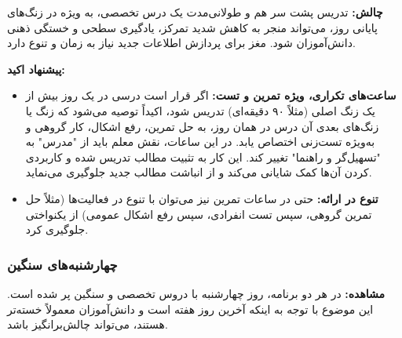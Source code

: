 \documentclass[a4paper]{article}
\begin{document}
\textbf{چالش:} تدریس پشت سر هم و طولانی‌مدت یک درس تخصصی، به ویژه در زنگ‌های پایانی روز، می‌تواند منجر به کاهش شدید تمرکز، یادگیری سطحی و خستگی ذهنی دانش‌آموزان شود. مغز برای پردازش اطلاعات جدید نیاز به زمان و تنوع دارد.

\textbf{پیشنهاد اکید:}
\begin{itemize}
    \item \textbf{ساعت‌های تکراری، ویژه تمرین و تست:}  اگر قرار است درسی در یک روز بیش از یک زنگ اصلی (مثلاً ۹۰ دقیقه‌ای) تدریس شود، اکیداً توصیه می‌شود که زنگ یا زنگ‌های بعدی آن درس در همان روز، به حل تمرین، رفع اشکال، کار گروهی و به‌ویژه تست‌زنی اختصاص یابد. در این ساعات، نقش معلم باید از "مدرس" به "تسهیل‌گر و راهنما" تغییر کند. این کار به تثبیت مطالب تدریس شده و کاربردی کردن آن‌ها کمک شایانی می‌کند و از انباشت مطالب جدید جلوگیری می‌نماید.
    \item \textbf{تنوع در ارائه:} حتی در ساعات تمرین نیز می‌توان با تنوع در فعالیت‌ها (مثلاً حل تمرین گروهی، سپس تست انفرادی، سپس رفع اشکال عمومی) از یکنواختی جلوگیری کرد.
\end{itemize}
\medskip

\subsubsection*{چهارشنبه‌های سنگین}
\textbf{مشاهده:} در هر دو برنامه، روز چهارشنبه با دروس تخصصی و سنگین پر شده است. این موضوع با توجه به اینکه آخرین روز هفته است و دانش‌آموزان معمولاً خسته‌تر هستند، می‌تواند چالش‌برانگیز باشد.
\end{document}
